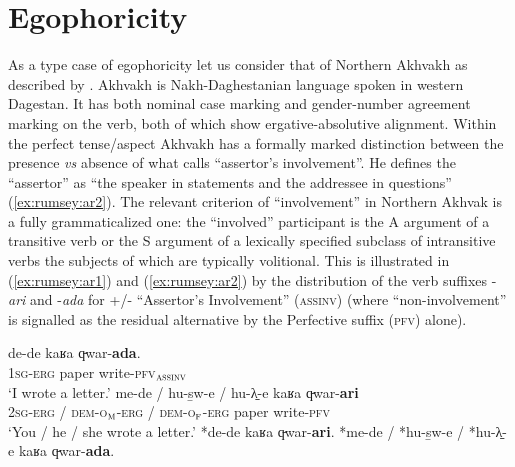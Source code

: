 \documentclass[output=paper]{langsci/langscibook}
\begin{document}
\section{Egophoricity}\label{s:ar2}

As a type case of egophoricity let us consider that of Northern Akhvakh as described by \cite{Creissels2008}.   Akhvakh is Nakh-Daghestanian language spoken in western Dagestan. It has both nominal case marking and gender-number agreement marking on the verb, both of which show ergative-absolutive alignment. Within the perfect tense/aspect Akhvakh has a formally marked distinction between the presence \textit{vs} absence of what \citeauthor{Creissels2008} calls “assertor’s involvement”. He defines the “assertor” as “the speaker in statements and the addressee in questions” (\ref{ex:rumsey:ar2}). The relevant criterion of “involvement” in Northern Akhvak is a fully grammaticalized one: the “involved” participant is the A argument of a transitive verb or the S argument of a lexically specified subclass of intransitive verbs the subjects of which are typically volitional. This is illustrated in (\ref{ex:rumsey:ar1}) and (\ref{ex:rumsey:ar2}) by the distribution of the verb suffixes -\textit{ari} and  -\textit{ada} for +/- “Assertor’s Involvement” (\textsc{assinv})  (where “non-involvement” is signalled as the residual alternative by the Perfective suffix (\textsc{pfv}) alone).

\begin{exe}
	\ex 	\label{ex:rumsey:ar1}
	\begin{xlist}
		\ex \label{ex:rumsey:ar1a}
		\gll de-de kaʁa q̵war-\textbf{ada}.\\
		1\textsc{sg}-\textsc{erg} paper	write-\textsc{pfv}$_{\textsc{assinv}}$\\
		\trans ‘I wrote a letter.’
		\ex \label{ex:rumsey:ar1b}
		\gll me-de / hu-s̱w-e / hu-λ̱-e kaʁa q̵war-\textbf{ari}\\
		2\textsc{sg}-\textsc{erg} / \textsc{dem}-\textsc{o}$_\textsc{m}$-\textsc{erg} / \textsc{dem}-\textsc{o}$_\textsc{f}$-\textsc{erg} paper	write-\textsc{pfv}\\
		\trans ‘You / he / she wrote a letter.’
		\ex \label{ex:rumsey:ar1c} *de-de kaʁa q̵war-\textbf{ari}.
		\ex \label{ex:rumsey:ar1d} *me-de / *hu-s̱w-e / *hu-λ̱-e kaʁa q̵war-\textbf{ada}.\\ \cite[1]{Creissels2008}
	\end{xlist}
\end{exe}
\end{document}

